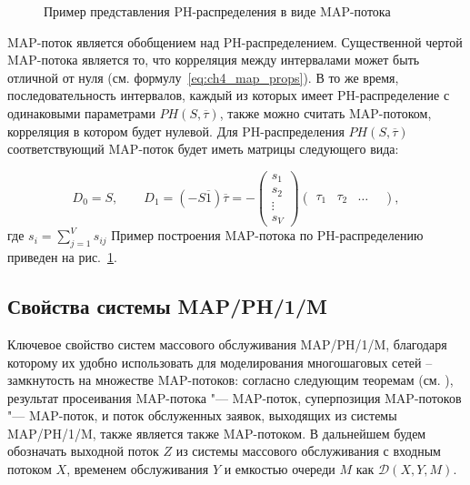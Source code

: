 \begin{figure}[h]
    \caption{Пример представления PH-распределения в виде MAP-потока
    \label{fig:ch4_ph2map}}
\end{figure}

MAP-поток является обобщением над PH-распределением. Существенной чертой MAP-потока является то, что корреляция между интервалами может быть отличной от нуля (см. формулу~\eqref{eq:ch4_map_props}). В то же время, последовательность интервалов, каждый из которых имеет PH-распределение с одинаковыми параметрами $PH(S, \overline{\tau})$, также можно считать MAP-потоком, корреляция в котором будет нулевой. Для PH-распределения $PH(S, \overline{\tau})$ соответствующий MAP-поток будет иметь матрицы следующего вида:

\begin{equation}
    \label{eq:ch4_map_ph_representation}
    D_0 = S, \qquad D_1 = (-S \overline{1}) \overline{\tau} = -\left(
        \begin{matrix}
            s_1\\
            s_2\\
            \vdots\\
            s_V
        \end{matrix}
     \right) \left(
         \begin{matrix}
            \tau_1 & \tau_2 & \dots &
         \end{matrix}
     \right),
\end{equation}
где $s_i = \sum_{j=1}^V s_{ij}$
Пример построения MAP-потока по PH-распределению приведен на рис.~\ref{fig:ch4_ph2map}.



\subsection{Свойства системы MAP/PH/1/M}\label{sec:ch4_queue_net_system_props}

Ключевое свойство систем массового обслуживания MAP/PH/1/M, благодаря которому их удобно использовать для моделирования многошаговых сетей -- замкнутость на множестве MAP-потоков: согласно следующим теоремам (см. \cite{VishnevskyDudin2018}), результат просеивания MAP-потока "--- MAP-поток, суперпозиция MAP-потоков "--- MAP-поток, и поток обслуженных заявок, выходящих из системы MAP/PH/1/M, также является также MAP-потоком. В дальнейшем будем обозначать выходной поток $Z$ из системы массового обслуживания с входным потоком $X$, временем обслуживания $Y$ и емкостью очереди $M$ как $\mathcal{D}(X, Y, M)$.

